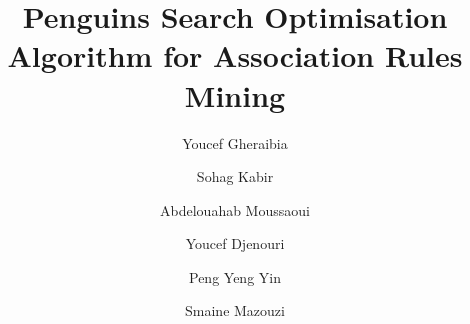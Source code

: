 \documentclass[preprint,12pt]{elsarticle}
\begin{document}
\begin{frontmatter}



\title{Penguins Search Optimisation Algorithm for Association Rules Mining}


\author[a,b]{Youcef Gheraibia}
\author[a]{Sohag Kabir}
\author[c]{Abdelouahab Moussaoui}
\author[d]{Youcef Djenouri}
\author[e]{Peng Yeng Yin}
\author[b]{Smaine Mazouzi}

\address[a]{Department of Computer Science, University of Hull, Hull HU6 7RX, UK}

\address[b]{ Badji Mokhtar-Annaba University, P.O. Box 12, 23000 Annaba, Algeria}

\address[c]{Laboratoire de Recherche en Informatique Appliquée (LRIA), Computer Science Department, University of Sétif, 19000, Algeria}

\address[d]{DTISI, CERIST Research Center, Algiers, Algeria}

\address[e]{Department of Information Management, National Chi Nan University, Taiwan}


\begin{abstract}


\end{abstract}
\end{frontmatter}
\end{document}
